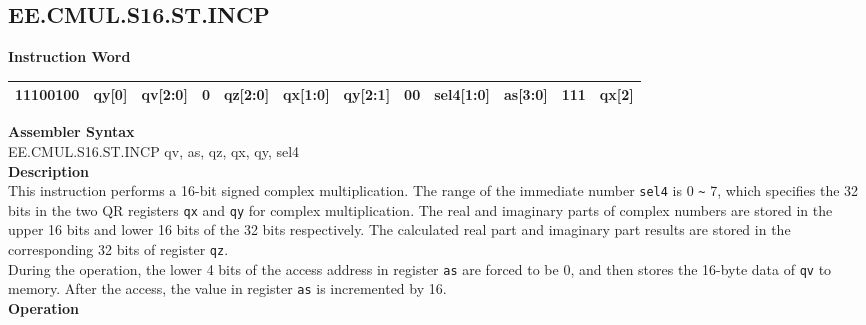 \clearpage
\subsection{EE.CMUL.S16.ST.INCP}\label{instruction:EECMULS16STINCP}
\setlength\tabcolsep{6pt}
\textbf{Instruction Word} \\
\begin{tabular}{|c|c|c|c|c|c|c|c|c|c|c|c|}
	\hline
	11100100 & qy[0] & qv[2:0] & 0 & qz[2:0] & qx[1:0] & qy[2:1] & 00 & sel4[1:0] & as[3:0] & 111 & qx[2] \\
	\hline
\end{tabular}

\textbf{Assembler Syntax} \\
EE.CMUL.S16.ST.INCP qv, as, qz, qx, qy, sel4 \\
\textbf{Description} \\
This instruction performs a 16-bit signed complex multiplication. The range of the immediate number \lstinline{sel4} is 0 \verb+~+ 7, which specifies the 32 bits in the two QR registers \lstinline{qx} and \lstinline{qy} for complex multiplication. The real and imaginary parts of complex numbers are stored in the upper 16 bits and lower 16 bits of the 32 bits respectively. The calculated real part and imaginary part results are stored in the corresponding 32 bits of register \lstinline{qz}. \\ During the operation, the lower 4 bits of the access address in register \lstinline{as} are forced to be 0, and then stores the 16-byte data of \lstinline{qv} to memory. After the access, the value in register \lstinline{as} is incremented by 16.\\
\textbf{Operation}
